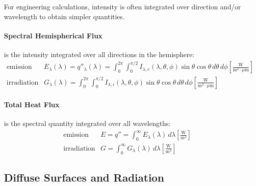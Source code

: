 For engineering calculations, intensity is often integrated over direction and/or wavelength to obtain simpler quantities.

\paragraph{Spectral Hemispherical Flux} is the intensity integrated over all directions in the hemisphere:
\[
    \begin{array}{ll}
        \text{emission} &  E_{\lambda}(\lambda) =  q''_{\lambda}(\lambda)= \int_0^{2\pi} \int_0^{\pi/2} I_{\lambda,e}(\lambda,\theta,\phi) \sin\theta \cos\theta \, d\theta \, d\phi \left[\frac{\text{W}}{\text{m}^2 \cdot \mu\text{m}}\right]
        \\[1.5em]
        \text{irradiation} & G_{\lambda}(\lambda) = \int_0^{2\pi} \int_0^{\pi/2} I_{\lambda,i}(\lambda,\theta,\phi) \sin\theta \cos\theta \, d\theta \, d\phi \left[\frac{\text{W}}{\text{m}^2 \cdot \mu\text{m}}\right]
    \end{array}
\]

\paragraph{Total Heat Flux} is the spectral quantity integrated over all wavelengths:
\[
    \begin{array}{ll}
        \text{emission} &  E = q'' = \int_0^{\infty} E_{\lambda}(\lambda) \, d\lambda \left[\frac{\text{W}}{\text{m}^2}\right]
        \\[1.5em]
        \text{irradiation} & G = \int_0^{\infty} G_{\lambda}(\lambda) \, d\lambda \left[\frac{\text{W}}{\text{m}^2}\right]
    \end{array}
\]


\subsection*{Diffuse Surfaces and Radiation}

